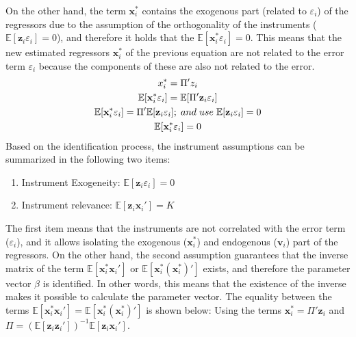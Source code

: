 \documentclass{article}
\newcommand\tab[1][0.5cm]{\hspace*{#1}}
\begin{document}
\newline
On the other hand, the term $\textbf{x}_{i}^{*}$ contains the exogenous part (related to $\varepsilon_{i}$) of the regressors due to the assumption of the orthogonality of the instruments ($\mathbb{E}[\textbf{z}_{i} \varepsilon_{i} ]=0$), and therefore it holds that the $\mathbb{E}[\textbf{x}_{i}^{*} \varepsilon_{i}] = 0 $. This means that the new estimated regressors $\textbf{x}_{i}^{*}$ of the previous equation are not related to the error term $\varepsilon_{i}$ because the components of these are also not related to the error.
\begin{gather*}
x_{i}^{*} =  \Pi' z_{i} \\
\mathbb{E}[\textbf{x}_{i}^{*} \varepsilon_{i}] = \mathbb{E}[\Pi' \textbf{z}_{i} \varepsilon_{i}] \\
\mathbb{E}[\textbf{x}_{i}^{*} \varepsilon_{i}] = \Pi' \mathbb{E}[\textbf{z}_{i} \varepsilon_{i}] ;\tab[0.1cm] and\tab[0.1cm] use \tab[0.1cm] \mathbb{E}[\textbf{z}_{i} \varepsilon_{i} ]=0 \\
\mathbb{E}[\textbf{x}_{i}^{*} \varepsilon_{i}] = 0
\end{gather*} 
Based on the identification process, the instrument assumptions can be summarized in the following two items:
\begin{enumerate}
    \item Instrument Exogeneity: $\mathbb{E}[\textbf{z}_{i} \varepsilon_{i}] = 0$
    \item Instrument relevance: $\mathbb{E}[\textbf{z}_{i} \textbf{x}_{i}'] = K$
\end{enumerate}
The first item means that the instruments are not correlated with the error term ($\varepsilon_{i}$), and it allows isolating the exogenous ($\textbf{x}_{i}^{*}$) and endogenous ($\textbf{v}_{i}$) part of the regressors. On the other hand, the second assumption guarantees that the inverse matrix of the term $\mathbb{E}[\textbf{x}_{i}^{*} \textbf{x}_{i}']$ or $\mathbb{E}[\textbf{x}_{i}^{*} (\textbf{x}_{i}^{*})']$ exists, and therefore the parameter vector $\beta$ is identified. In other words, this means that the existence of the inverse makes it possible to calculate the parameter vector. The equality between the terms $\mathbb{E}[\textbf{x}_{i}^{*} \textbf{x}_{i}'] = \mathbb{E}[\textbf{x}_{i}^{*} (\textbf{x}_{i}^{*})']$ is shown below:
\newline
Using the terms $\textbf{x}_{i}^{*} =  \Pi' \textbf{z}_{i}$ and $\Pi = (\mathbb{E}[\textbf{z}_{i} \textbf{z}_{i}'])^{-1} \mathbb{E}[\textbf{z}_{i} \textbf{x}_{i}']$.
\end{document}
